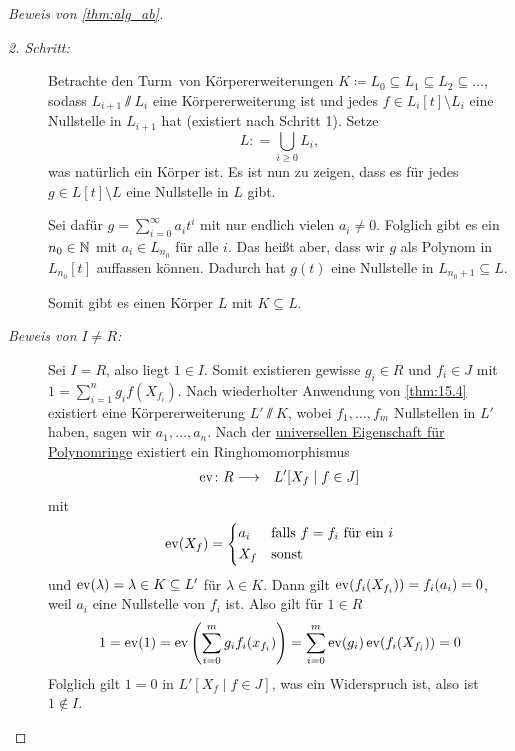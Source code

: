 \documentclass[12pt,a4paper]{scrartcl}
\begin{document}
\begin{proof}[Beweis von \cref{thm:alg_ab}]
\begin{description}
		\item[\emph{2. Schritt:}] Betrachte den \glqq Turm\grqq\ von Körpererweiterungen $K \coloneqq L_0\subseteq L_1\subseteq L_2\subseteq\dots$, sodass $L_{i+1}\sslash L_{i}$ eine Körpererweiterung ist und jedes $f\in L_i[t]\setminus L_i$ eine Nullstelle in $L_{i+1}$ hat (existiert nach Schritt 1). Setze
		\[L : = \bigcup\limits_{i\geq 0} L_i, \]
		was natürlich ein Körper ist. Es ist nun zu zeigen, dass es für jedes $g\in L[t]\setminus L$ eine Nullstelle in $L$ gibt.
		
		Sei dafür $g = \sum_{i = 0}^{\infty}a_it^i$ mit nur endlich vielen $a_i\neq 0$. Folglich gibt es ein $n_0\in\mathbb N$ mit $a_i\in L_{n_0}$ für alle $i$. Das heißt aber, dass wir $g$ als Polynom in $L_{n_0}[t]$ auffassen können. Dadurch hat $g(t)$ eine Nullstelle in $L_{n_0+1}\subseteq L$.
		
		Somit gibt es einen Körper $L$ mit $K\subseteq L$.
		\item[\emph{Beweis von $I\neq R$:}] Sei $I = R$, also liegt $1\in I$. Somit existieren gewisse $g_i\in R$ und $f_i\in J$ mit $1 = \sum_{i =1}^{n}g_if(X_{f_i})$. Nach wiederholter Anwendung von \cref{thm:15.4} existiert eine Körpererweiterung $L'\sslash K$, wobei $f_1,\dots, f_m$ Nullstellen in $L'$ haben, sagen wir $a_1,\dots, a_n$. Nach der \hyperref[thm:unieig_polyring]{universellen Eigenschaft für Polynomringe} existiert ein Ringhomomorphismus
		\begin{eqnarray*}
			\operatorname{ev}\colon R & \longrightarrow & L'[X_f\mid f\in J]
		\end{eqnarray*}
		mit \[\ev(X_f) = \begin{cases*} a_i & falls $f=f_i$ für ein $i$\\
		X_f & sonst
		\end{cases*}\]							
		und $\operatorname{ev}(\lambda)  = \lambda\in K\subseteq L'$ für $\lambda\in K$. Dann gilt $\operatorname{ev}(f_i(X_{f_i})) = f_i(a_i) = 0$, weil $a_i$ eine Nullstelle von $f_i$ ist. Also gilt für $1\in R$ 
		\[1 = \operatorname{ev}(1) = \operatorname{ev}\left(\sum_{i = 0}^{m}g_if_i(x_{f_i})\right) = \sum_{i = 0}^m\operatorname{ev}(g_i)\operatorname{ev}(f_i(X_{f_i})) = 0\]
		Folglich gilt $1 = 0$ in $L'[X_f\mid f\in J]$, was ein Widerspruch ist, also ist $1\notin I$.
  \qedhere
	\end{description}
\end{proof}
	
\end{document}
